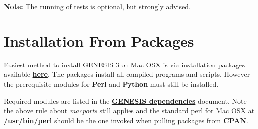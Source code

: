 \documentclass[12pt]{article}
\begin{document}
{\bf Note:} The running of tests is optional, but strongly advised.



\section*{Installation From Packages}

	Easiest method to install GENESIS 3 on Mac OSX is via installation packages available \href{http://repo-genesis3.cbi.utsa.edu/osx/}{\bf here}. The packages install all compiled programs and scripts. However the prerequisite modules for {\bf Perl} and {\bf Python} must still be installed. 
	
	Required modules are listed in the \href{../genesis-dependencies/genesis-dependencies.tex}{\bf GENESIS dependencies} document. Note the above rule about {\it macports} still applies and the standard perl for Mac OSX at {\bf /usr/bin/perl} should be the one invoked when pulling packages from {\bf CPAN}.
\end{document}
